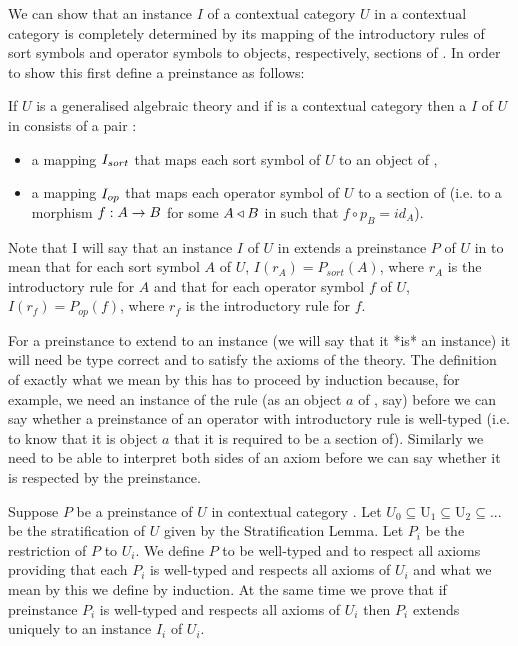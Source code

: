 \note
We can show that an instance $I$ of a contextual category $U$ in a contextual category \catcw is
completely determined by its mapping of the introductory rules of sort symbols and operator symbols to
objects, respectively, sections of \catc. In order to show this first define a preinstance as follows:
\begin{definition}
If $U$ is a generalised algebraic theory  and if \catcw is a contextual category then
a  $I$ of  $U$ in \catcw consists of a pair :
\begin{itemize}
\item a mapping $I_{sort}$ that maps each sort symbol of $U$ to  an object of \catc,
\item a mapping $I_{op}$ that maps each operator symbol of $U$ to a section of \catcw (i.e. to a morphism $f: A \rightarrow B$ for some 
$A \triangleleft B$ in \catcw such that $f \circ p_B=id_A$).
\end{itemize}
\end{definition}

Note that I will say that an instance $I$ of $U$ in \catcw extends a preinstance $P$ of $U$ in \catcw to mean that for each sort symbol $A$ of $U$,
$I(r_A) = P_{sort}(A)$, where $r_A$ is the introductory rule for $A$ and that for each operator symbol
$f$ of $U$,   $I(r_f) = P_{op}(f)$, where $r_f$ is the introductory rule for $f$.

\note
 For a preinstance to extend to an instance (we will say that it *is* an instance) 
it will need be type correct and to satisfy the axioms of the theory. The definition of exactly what we mean by this has to proceed by induction because, for example, we need an instance of the rule
 (as an object $a$ of \catc, say) before we can say whether a preinstance of an operator with introductory rule \genericfintroductoryrule
is well-typed (i.e. to know that it is object $a$ that it is required to be a section of).
Similarly we need to be able to interpret both sides of an axiom before we can say whether it is respected
by the preinstance. 

\note Suppose $P$ be a preinstance of $U$ in contextual category \catc.
Let $U_0 \subseteq $U$_1 \subseteq $U$_2 \subseteq ...$ be the stratification of $U$ given by the Stratification Lemma. 
Let $P_i$ be the restriction of $P$ to $U_i$. 
We define $P$ to be well-typed and to respect all axioms 
providing that  each  $P_i$ is well-typed and respects all axioms of $U_i$ and 
what we mean by this we define by induction. 
At the same time we prove that if preinstance $P_i$ is well-typed and respects all axioms of $U_i$ then $P_i$
extends uniquely to an instance $I_i$ of $U_i$.  

